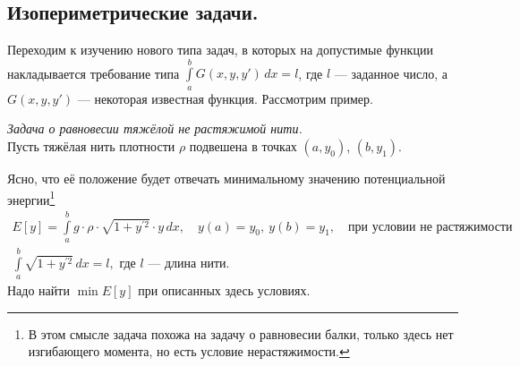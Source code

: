 	\chapter{}
\label{lecture4}
\section{Изопериметрические задачи.}
\label{lecture4section1}
Переходим к изучению нового типа задач, в которых на допустимые функции накладывается требование типа $\int\limits_a^b G(x,y,y')\,dx=l$, где $l$ --- заданное число, а $G(x,y,y')$ --- некоторая известная функция. Рассмотрим пример.

\noindent\emph{Задача о равновесии тяжёлой не растяжимой нити.}\\
Пусть тяжёлая нить плотности $\rho$ подвешена в точках $(a,y_0)$, $(b,y_1)$.



Ясно, что её положение будет отвечать минимальному значению потенциальной энергии\footnote[1]{В этом смысле задача похожа на задачу о равновесии балки, только здесь нет изгибающего момента, но есть условие нерастяжимости.}
\begin{gather*}
	E[y]=\int\limits_a^b g\cdot\rho\cdot\sqrt{1+y^{\prime2}}\cdot y\,dx,\quad y(a)=y_0,\ y(b)=y_1,\quad\text{при условии не растяжимости}\\
	\int\limits_a^b\sqrt{1+y^{\prime2}}\,dx=l,\text{ где $l$ --- длина нити.}
\end{gather*}	
Надо найти $\min E[y]$ при описанных здесь условиях.

